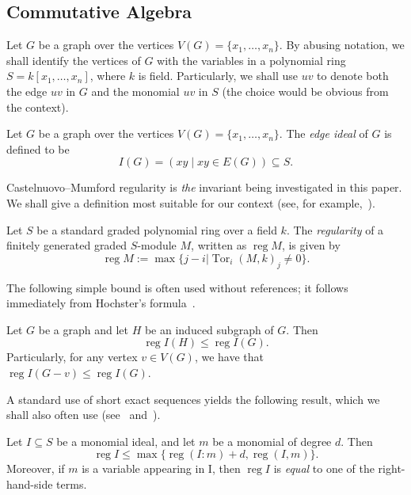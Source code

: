 \documentclass[ALCO,ThmDefs,Unicode,epreuves]{cedram}
\DeclareMathOperator{\reg}{reg}
\DeclareMathOperator{\Tor}{Tor}
\newcommand*{\reg}{\mathrm{reg}}
\begin{document}
\subsection{Commutative Algebra} 
Let $G$ be a graph over the vertices $V(G)  = \{x_1, \dots, x_n\}$. By abusing notation, we shall identify the vertices of $G$ with the variables in a polynomial ring $S = k[x_1, \dots, x_n]$, where $k$ is field. Particularly, we shall use $uv$ to denote both the edge $uv$ in $G$ and the monomial $uv$ in $S$ (the choice would be obvious from the context).

\begin{defi} Let $G$ be a graph over the vertices $V(G) = \{x_1, \dots, x_n\}$. The \emph{edge ideal} of $G$ is defined to be
\[
I(G) =( xy  \mid  xy \in E(G)) \subseteq S.
\]

\end{defi}

Castelnuovo--Mumford regularity is \emph{the} invariant being investigated in this paper. We shall give a definition most suitable for our context (see, for example,~\cite[p. 168]{BrHe}).

\begin{defi}
Let $S$ be a standard graded polynomial ring over a field $k$. The \emph{regularity} of a finitely generated graded $S$-module $M$, written as $\reg M$, is given by
\[
\reg M := \max \{j-i|\Tor_{i} (M,k)_j \neq 0 \}.
\]

\end{defi}



The following simple bound is often used without references; it follows immediately from Hochster's formula~\cite[Theorem 5.1]{Hochster}.

\begin{lemm}\label{lem.indsubgraph}
Let $G$ be a graph and let $H$ be an induced subgraph of $G$. Then
\[
\reg I(H) \le \reg I(G).
\]
Particularly, for any vertex $v \in V(G)$, we have that $\reg I(G - v) \le \reg I(G).$
\end{lemm}

A standard use of short exact sequences yields the following result, which we shall also often use (see~\cite[Lemma 2.10]{DHS} and~\cite[Lemma 2.11]{Ba}).

\begin{lemm}\label{exact}
Let $I \subseteq S$ be a monomial ideal, and let $m$ be a monomial of degree $d$. Then
\[
\reg I \le \max\{ \reg (I : m) + d, \reg (I,m)\}.
\]
Moreover, if $m$ is a variable appearing in I, then $\reg I$ is \emph{equal} to one of the right-hand-side terms.
\end{lemm}
\end{document}
